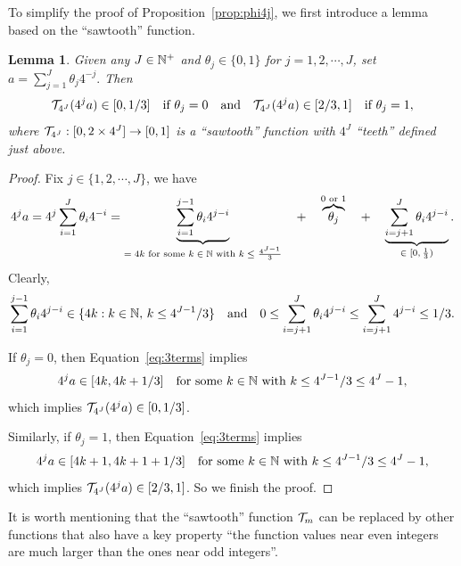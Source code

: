 \documentclass[nohyperref]{article}
\theoremstyle{plain}
\newtheorem{lemma}[theorem]{Lemma}
\theoremstyle{definition}
\theoremstyle{remark}
\begin{document}
To simplify the proof of Proposition~\ref{prop:phi4j}, we first introduce a lemma based on the ``sawtooth'' function.
\begin{lemma}
	\label{lem:T4J}
	Given any $J\in \N^+$ and $\theta_j\in \{0,1\}$ for $j=1,2,\cdots,J$, set $a=\sum_{j=1}^J \theta_j4^{-j}.$
	Then
	\begin{equation}
		\label{eq:tooth4J}
		{\mathcal{T}}_{4^J}(4^{j}a)\in [0,1/3]\quad \textnormal{if $\theta_j=0$}\quad \textnormal{and} \quad {\mathcal{T}}_{4^J}(4^{j}a)\in [2/3,1]\quad \textnormal{if $\theta_j=1$},
	\end{equation}
	where ${\mathcal{T}}_{4^J}:[0,2\times 4^J]\to [0,1]$ is a ``sawtooth'' function with $4^J$ ``teeth'' defined just above.
\end{lemma}
\begin{proof}
	Fix $j\in \{1,2,\cdots,J\}$, we have
	\begin{equation}\label{eq:3terms}
		\begin{split}
			4^{j}a=4^{j}\sum_{i=1}^J \theta_i4^{-i}
			= \underbrace{\sum_{i=1}^{j-1} \theta_i4^{j-i}}_{\tn{$=4k$ for some $k\in \N$ with $k\le\tfrac{ 4^{J-1}}3$}}
			\quad +\quad  \overbrace{\theta_j}^{\tn{$0$ or $1$}}
			\quad +\quad 
			\underbrace{\sum_{i=j+1}^{J} \theta_i4^{j-i}}_{\tn{$\in [0,\tfrac13)$}}.
		\end{split}
	\end{equation}
	Clearly, 
	\begin{equation*}
		\sum_{i=1}^{j-1} \theta_i4^{j-i}\in \{4k:k\in\N,\,k\le 4^{J-1}/3 \}\quad 
		\tn{and}\quad 0\le \sum_{i=j+1}^{J} \theta_i4^{j-i}\le \sum_{i=j+1}^{J} 4^{j-i}\le 1/3.
	\end{equation*}
	
	If $\theta_j=0$, then Equation~\eqref{eq:3terms} implies
	\begin{equation*}
		4^ja\in [4k,4k+1/3]\quad \tn{for some $k\in \N$ with $k\le 4^{J-1}/3\le 4^J-1$,}
	\end{equation*}
	which implies ${\mathcal{T}}_{4^J}(4^ja)\in [0,1/3]$. 
	
	Similarly, if $\theta_j=1$, then Equation~\eqref{eq:3terms} implies
	\begin{equation*}
		4^ja\in [4k+1,4k+1+1/3]\quad \tn{for some $k\in \N$ with $k\le 4^{J-1}/3\le 4^J-1$,}
	\end{equation*}
	which implies ${\mathcal{T}}_{4^J}(4^ja)\in [2/3,1]$. 
	So we finish the proof.
\end{proof}
It is worth mentioning that the ``sawtooth'' function ${\mathcal{T}}_m$ can be replaced by other functions that also have a key property ``the function values near even integers are much larger than the ones near odd integers''.  
\end{document}
